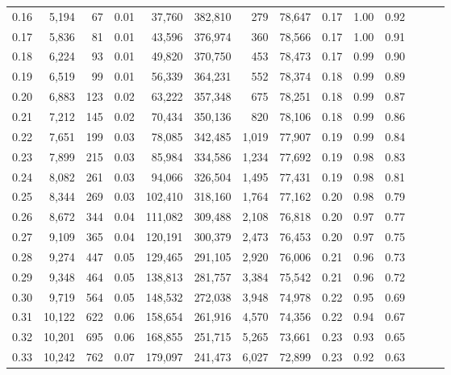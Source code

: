 \begin{tabular}{rrrrrrrrrrrrrr}
0.16 &   5,194 &     67 &  0.01 &   37,760 &  382,810 &     279 &  78,647 &  0.17 &  1.00 &      0.92 \\
0.17 &   5,836 &     81 &  0.01 &   43,596 &  376,974 &     360 &  78,566 &  0.17 &  1.00 &      0.91 \\
0.18 &   6,224 &     93 &  0.01 &   49,820 &  370,750 &     453 &  78,473 &  0.17 &  0.99 &      0.90 \\
0.19 &   6,519 &     99 &  0.01 &   56,339 &  364,231 &     552 &  78,374 &  0.18 &  0.99 &      0.89 \\
0.20 &   6,883 &    123 &  0.02 &   63,222 &  357,348 &     675 &  78,251 &  0.18 &  0.99 &      0.87 \\
0.21 &   7,212 &    145 &  0.02 &   70,434 &  350,136 &     820 &  78,106 &  0.18 &  0.99 &      0.86 \\
0.22 &   7,651 &    199 &  0.03 &   78,085 &  342,485 &   1,019 &  77,907 &  0.19 &  0.99 &      0.84 \\
0.23 &   7,899 &    215 &  0.03 &   85,984 &  334,586 &   1,234 &  77,692 &  0.19 &  0.98 &      0.83 \\
0.24 &   8,082 &    261 &  0.03 &   94,066 &  326,504 &   1,495 &  77,431 &  0.19 &  0.98 &      0.81 \\
0.25 &   8,344 &    269 &  0.03 &  102,410 &  318,160 &   1,764 &  77,162 &  0.20 &  0.98 &      0.79 \\
0.26 &   8,672 &    344 &  0.04 &  111,082 &  309,488 &   2,108 &  76,818 &  0.20 &  0.97 &      0.77 \\
0.27 &   9,109 &    365 &  0.04 &  120,191 &  300,379 &   2,473 &  76,453 &  0.20 &  0.97 &      0.75 \\
0.28 &   9,274 &    447 &  0.05 &  129,465 &  291,105 &   2,920 &  76,006 &  0.21 &  0.96 &      0.73 \\
0.29 &   9,348 &    464 &  0.05 &  138,813 &  281,757 &   3,384 &  75,542 &  0.21 &  0.96 &      0.72 \\
0.30 &   9,719 &    564 &  0.05 &  148,532 &  272,038 &   3,948 &  74,978 &  0.22 &  0.95 &      0.69 \\
0.31 &  10,122 &    622 &  0.06 &  158,654 &  261,916 &   4,570 &  74,356 &  0.22 &  0.94 &      0.67 \\
0.32 &  10,201 &    695 &  0.06 &  168,855 &  251,715 &   5,265 &  73,661 &  0.23 &  0.93 &      0.65 \\
0.33 &  10,242 &    762 &  0.07 &  179,097 &  241,473 &   6,027 &  72,899 &  0.23 &  0.92 &      0.63 \\

\end{tabular}
